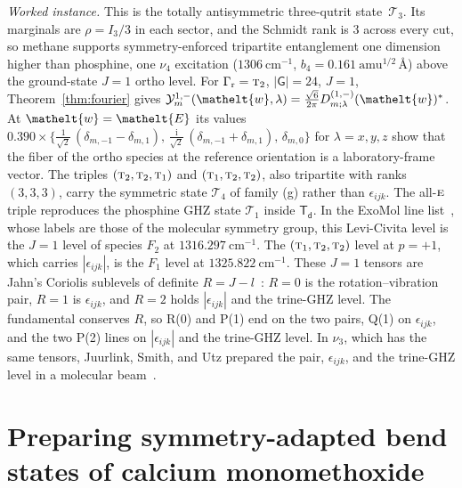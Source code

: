 \documentclass[
  reprint,
  aps,
  prx,
  superscriptaddress,
  amsmath,
  amssymb,
  longbibliography
]{revtex4-2}
\newcommand{\eltfont}[1]{{\let\sigma\eltsigma\mathelt{#1}}}
\newcommand{\grp}[1]{\mathsf{#1}}
\newcommand{\irr}[1]{\text{\normalfont\scshape #1}}
\newcommand{\elt}[1]{\eltfont{#1}}
\newcommand{\iunit}{\mathrm{i}}
\newcommand{\irrJp}[2]{D^{(#1,#2)}}
\newcommand{\crep}{\elt{w}}           %
\newcommand{\parity}{p}               %
\providecommand{\Grot}{\Gamma_{\mathrm{r}}}
\newcommand{\catT}[1]{\mathcal{T}_{#1}}
\begin{document}
\emph{Worked instance.} This is the totally antisymmetric three-qutrit state~$\catT{3}$. Its marginals are $\rho=I_3/3$ in each sector, and the Schmidt rank is $3$ across every cut, so methane supports symmetry-enforced tripartite entanglement one dimension higher than phosphine, one $\nu_4$ excitation ($1306\ \mathrm{cm^{-1}}$, $b_4=0.161\ \mathrm{amu^{1/2}\,\text{\AA}}$) above the ground-state $J=1$ ortho level. For $\Grot=\irr{t}_{2}$, $|\grp{G}|=24$, $J=1$, Theorem~\ref{thm:fourier} gives $\mathcal Y^{1,-}_m(\crep,\lambda)=\tfrac{\sqrt6}{2\pi}\irrJp{1}{-}_{m;\lambda}(\crep)^{*}$. At $\crep=\elt{E}$ its values $0.390\times\{\tfrac{1}{\sqrt{2}}\,(\delta_{m,-1}-\delta_{m,1}),\,\tfrac{\iunit}{\sqrt2}\,(\delta_{m,-1}+\delta_{m,1}),\,\delta_{m,0}\}$ for $\lambda=x,y,z$ show that the fiber of the ortho species at the reference orientation is a laboratory-frame vector. The triples $(\irr{t}_{2},\irr{t}_{2},\irr{t}_{1})$ and $(\irr{t}_{1},\irr{t}_{2},\irr{t}_{2})$, also tripartite with ranks $(3,3,3)$, carry the symmetric state $\catT{4}$ of family (g) rather than $\epsilon_{ijk}$. The all-$\irr{e}$ triple reproduces the phosphine GHZ state $\catT{1}$ inside $\grp{T_{d}}$. In the ExoMol line list~\cite{Yurchenko2024}, whose labels are those of the molecular symmetry group, this Levi-Civita level is the $J=1$ level of species $F_2$ at $1316.297\ \mathrm{cm^{-1}}$. The $(\irr{t}_{1},\irr{t}_{2},\irr{t}_{2})$ level at $\parity=+1$, which carries $|\epsilon_{ijk}|$, is the $F_1$ level at $1325.822\ \mathrm{cm^{-1}}$. These $J=1$ tensors are Jahn's Coriolis sublevels of definite $R=J-l$~\cite{Jahn1938, Hecht1961}: $R=0$ is the rotation--vibration pair, $R=1$ is $\epsilon_{ijk}$, and $R=2$ holds $|\epsilon_{ijk}|$ and the trine-GHZ level. The fundamental conserves $R$, so R(0) and P(1) end on the two pairs, Q(1) on $\epsilon_{ijk}$, and the two P(2) lines on $|\epsilon_{ijk}|$ and the trine-GHZ level. In $\nu_3$, which has the same tensors, Juurlink, Smith, and Utz prepared the pair, $\epsilon_{ijk}$, and the trine-GHZ level in a molecular beam~\cite{Juurlink2000}.








\section{Preparing symmetry-adapted bend states of calcium monomethoxide}
\label{sec:experiment}
\end{document}
